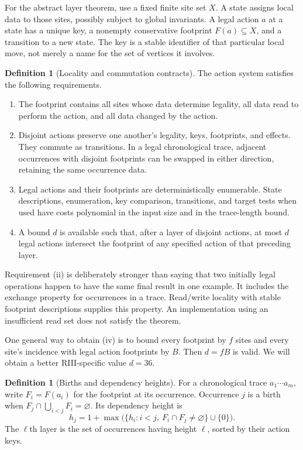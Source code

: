 \documentclass[11pt]{article}
\theoremstyle{definition}
\newtheorem{definition}[theorem]{Definition}
\begin{document}
For the abstract layer theorem, use a fixed finite site set $X$. A state
assigns local data to those sites, possibly subject to global invariants. A
legal action $a$ at a state has a unique key, a nonempty conservative footprint
$F(a)\subseteq X$, and a transition to a new state. The key is a stable
identifier of that particular local move, not merely a name for the set of
vertices it involves.

\begin{definition}[Locality and commutation contracts]
The action system satisfies the following requirements.
\begin{enumerate}[label=(\roman*)]
\item The footprint contains all sites whose data determine legality, all
data read to perform the action, and all data changed by the action.
\item Disjoint actions preserve one another's legality, keys, footprints,
and effects. They commute as transitions. In a legal chronological trace,
adjacent occurrences with disjoint footprints can be swapped in either
direction, retaining the same occurrence data.
\item Legal actions and their footprints are deterministically enumerable.
State descriptions, enumeration, key comparison, transitions, and target
tests when used have costs polynomial in the input size and in the
trace-length bound.
\item A bound $d$ is available such that, after a layer of disjoint actions,
at most $d$ legal actions intersect the footprint of any specified action
of that preceding layer.
\end{enumerate}
\end{definition}

Requirement (ii) is deliberately stronger than saying that two initially
legal operations happen to have the same final result in one example. It
includes the exchange property for occurrences in a trace. Read/write
locality with stable footprint descriptions supplies this property. An
implementation using an insufficient read set does not satisfy the theorem.

One general way to obtain (iv) is to bound every footprint by $f$ sites and
every site's incidence with legal action footprints by $B$. Then $d=fB$
is valid. We will obtain a better RIII-specific value $d=36$.

\begin{definition}[Births and dependency heights]
For a chronological trace $a_1\cdots a_m$, write $F_i=F(a_i)$ for the
footprint at its occurrence. Occurrence $j$ is a birth when
$F_j\cap\bigcup_{i<j}F_i=\varnothing$. Its dependency height is
\[
 h_j=1+\max\bigl(\{h_i:i<j,\ F_i\cap F_j\ne\varnothing\}\cup\{0\}\bigr).
\]
The $\ell$th layer is the set of occurrences having height $\ell$, sorted
by their action keys.
\end{definition}
\end{document}

